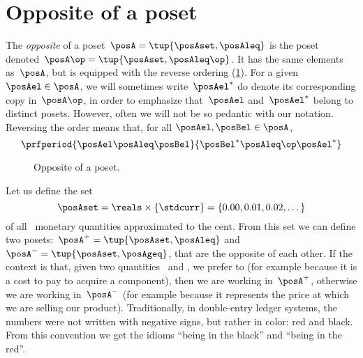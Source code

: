 
\section{Opposite of a poset}\label{sec:opposite-of-a-poset}

\begin{definition}
    \label{def:poset-opposite}
    The \emph{opposite} of a poset~$\posA=\tup{\posAset, \posAleq}$ is the poset denoted~$\posA\op=\tup{\posAset, \posAleq\op}$.
    It has the same elements as~$\posA$, but is equipped with the reverse ordering (\cref{fig:poset-opposite}).
    For a given~$\posAel \in \posA$, we will sometimes write~$\posAel^*$ do denote its corresponding copy in~$\posA\op$, in order to emphasize that~$\posAel$ and~$\posAel^*$ belong to distinct posets.
    However, often we will not be so pedantic with our notation.
    Reversing the order means that, for all $\posAel,\posBel\in \posA$,
    \begin{equation}
        \prfperiod{\posAel \posAleq \posBel}{\posBel^* \posAleq\op \posAel^*}
    \end{equation}
\end{definition}

\begin{figure}[tbh]
    \centering
    \caption{Opposite of a poset.}
    \label{fig:poset-opposite}
\end{figure}

\begin{example}
    Let us define the set
    \begin{equation*}
        \posAset=\reals \times \{\stdcurr\}=\{0.00,0.01,0.02,\dots\}
    \end{equation*}
    of all \stdcurr \ monetary quantities approximated to the cent.
    From this set we can define two posets:~$\posA^{+} = \tup{\posAset, \posAleq}$ and~$\posA^{-} = \tup{\posAset, \posAgeq}$, that are the opposite of each other.
    If the context is that, given two quantities~\unit[1]{\stdcurr} and \unit[2]{\stdcurr}, we prefer \unit[1]{\stdcurr} to \unit[2]{\stdcurr} (for example because it is a cost to pay to acquire a component), then we are working in~$\posA^{+}$, otherwise we are working in~$\posA^{-}$ (for example because it represents the price at which we are selling our product).
    Traditionally, in double-entry ledger systems, the numbers were not written with negative signs, but rather in color: red and black.
    From this convention we get the idioms ``being in the black'' and ``being in the red''.
\end{example}
